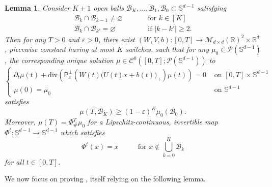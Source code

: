 \documentclass[a4paper,11pt]{article}
\theoremstyle{plain}
\newtheorem{lemma}[theorem]{Lemma}
\newcommand{\R}{\mathbb{R}}
\newcommand{\proj}{\bm{\mathsf{P}}^\perp}
\newcommand{\dive}{\mathrm{div}}
\renewcommand{\S}{\mathbb{S}^{d-1}}
\newcommand{\bW}{\bm{\mathit{W}}}
\newcommand{\bV}{\bm{\mathit{V}}}
\newcommand{\bU}{\bm{\mathit{U}}}
\renewcommand{\geq}{\geqslant}
\numberwithin{equation}{section}
\begin{document}
\begin{lemma} \label{lem: tubular.mass.movement}
Consider $K+1$ open balls $\mathscr{B}_K,\ldots,\mathscr{B}_1,\mathscr{B}_0\subset \S$ satisfying
\begin{align*}
        \mathscr{B}_k\cap\mathscr{B}_{k-1}\neq\varnothing \hspace{1cm} &\text{ for } k\in[K]\\
        \mathscr{B}_k\cap\mathscr{B}_{k'}=\varnothing \hspace{1cm} &\text{ if }|k-k'|\geq 2.
\end{align*}
Then for any $T>0$ and $\varepsilon>0$, there exist $(\bW,\bV,b):[0,T]\to\mathscr{M}_{d\times d}(\mathbb{R})^2\times\R^d$,  piecewise constant having at most $K$ switches, such that for any $\mu_0\in \mathscr{P}(\S)$, the corresponding unique solution $\mu\in \mathscr{C}^0([0,T];\mathscr{P}(\S))$ to 
\begin{equation} \label{eq: neural.pde.sphere}
\begin{cases}
\partial_t\mu(t)+\dive\left(\proj_x\left(\bW(t)\Big(\bU(t) x+b(t)\Big)_+\right)\mu(t)\right)=0 &\text{ on } [0, T]\times\S\\
\mu(0)=\mu_0 &\text{ on } \S
\end{cases}
\end{equation}
satisfies
    \begin{equation*}
        \mu(T,\mathscr{B}_K)\geq (1-\varepsilon)^K\mu_0\left(\mathscr{B}_0\right).
    \end{equation*}
    Moreover, $\mu(T)=\Phi^T_\#\mu_0$ for a Lipschitz-continuous, invertible map $\Phi^t:\S\to\S$ which satisfies
    \begin{equation}\label{eq: eq.tubular.mass.movement}
        \Phi^t(x)=x\hspace{1cm}\text{ for }x\notin \bigcup_{k=0}^K \mathscr{B}_k
    \end{equation}
    for all $t\in[0,T]$.
\end{lemma}

We now focus on proving , itself relying on the following lemma.
\end{document}
